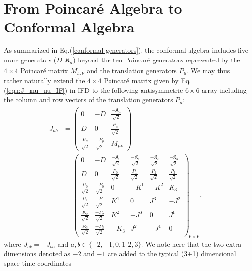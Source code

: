 \documentclass[foundations,article,submit,pdftex,moreauthors]{Definitions/mdpi}
\begin{document}

\section{From Poincar\'e Algebra to Conformal Algebra}
\label{sec:conformal-ifd}
As summarized in Eq.(\ref{conformal-generators}), the conformal algebra {includes} five more generators ($D, \mathfrak{K}_\mu$) beyond the ten Poincar\'e generators represented by the $4\times 4$ Poincar\'e matrix $M_{\mu,\nu}$ and the translation generators $P_\mu$. 
We may thus rather naturally extend the $4\times4$ Poincar\'e matrix given by Eq.(\ref{eqn:J_mu_nu_IF}) in IFD to the 
following antisymmetric $6\times6$ array \cite{Francesco,Blumenhagen,Ji-Hari-2026-PRD} including the column and row vectors of the translation generators $P_\mu$:
\begin{align}\label{Jab}
  J_{ab}&=\begin{pmatrix}
      0&-D&\frac{-\mathfrak{K}_{\mu}}{\sqrt{2}}\\
      D&0&\frac{P_{\mu}}{\sqrt{2}}\\
      \frac{\mathfrak{K}_{\mu}}{\sqrt{2}}&\frac{-P_{\mu}}{\sqrt{2}}&M_{\mu\nu}
  \end{pmatrix} \nonumber \\
  &=
  \begin{pmatrix}
  0&-D&\frac{-\mathfrak{K}_0}{\sqrt{2}}&\frac{-\mathfrak{K}_1}{\sqrt{2}}&\frac{-\mathfrak{K}_2}{\sqrt{2}}&\frac{-\mathfrak{K}_3}{\sqrt{2}}\\
  D&0&\frac{P_0}{\sqrt{2}}&\frac{P_1}{\sqrt{2}}&\frac{P_2}{\sqrt{2}}&\frac{P_3}{\sqrt{2}}\\
    \frac{\mathfrak{K}_0}{\sqrt{2}}&\frac{-P_0}{\sqrt{2}}&0 & -K^{1} & -K^{2} & K_3\\
    \frac{\mathfrak{K}_1}{\sqrt{2}}&\frac{-P_1}{\sqrt{2}}&K^{1} & 0 & J^{3} & -J^{2}\\
    \frac{\mathfrak{K}_2}{\sqrt{2}}&\frac{-P_2}{\sqrt{2}}&K^{2} & -J^{3} & 0 & J^{1}\\
    \frac{\mathfrak{K}_3}{\sqrt{2}}&\frac{-P_3}{\sqrt{2}}&-K_3 & J^{2} & -J^{1} & 0
  \end{pmatrix}_{6\times6} ,
\end{align}
where $J_{ab}=-J_{ba}$ and $a,b\in\{-2,-1,0,1,2,3\}$. We note here that the two extra dimensions denoted as $-2$ and $-1$ are added to the typical (3+1) dimensional space-time coordinates 
\end{document}
